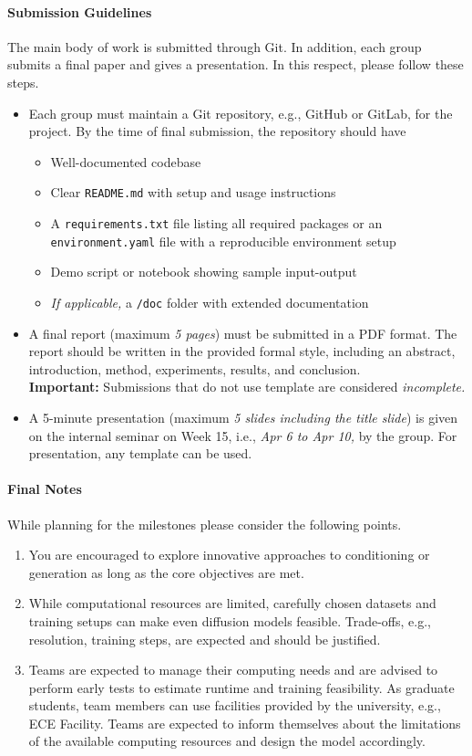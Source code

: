 \documentclass[11pt,a4paper,BCOR12mm, headexclude, footexclude, openright]{scrartcl}
\numberwithin{equation}{section}
\numberwithin{figure}{section}
\numberwithin{table}{section}
\begin{document}
\paragraph*{Submission Guidelines} The main body of work is submitted through Git. In addition, each group submits a final paper and gives a presentation. In this respect, please follow these steps.
\begin{itemize}
	\item Each group must maintain a Git repository, e.g., GitHub or GitLab, for the project. By the time of final submission, the repository should have
	\begin{itemize}
		\item Well-documented codebase
		\item Clear \texttt{README.md} with setup and usage instructions
		\item A \texttt{requirements.txt} file listing all required packages or an \texttt{environment.yaml} file with a reproducible environment setup
		\item Demo script or notebook showing sample input-output
		\item \textit{If applicable,} a \texttt{/doc} folder with extended documentation
	\end{itemize}
	\item A final report (maximum \textit{5 pages}) must be submitted in a PDF format. The report should be written in the provided formal style, including an abstract, introduction, method, experiments, results, and conclusion.\\
	\textbf{Important:} Submissions that do not use template are considered \textit{incomplete.}
	\item A 5-minute presentation (maximum \textit{5 slides including the title slide}) is given on the internal seminar on Week 15, i.e., \textit{Apr 6 to Apr 10,} by the group. For presentation, any template can be used.
\end{itemize}

	
	\paragraph*{Final Notes} While planning for the milestones please consider the following points.
	\begin{enumerate}
		\item You are encouraged to explore innovative approaches to conditioning or generation as long as the core objectives are met.
		\item While computational resources are limited, carefully chosen datasets and training setups can make even diffusion models feasible. Trade-offs, e.g., resolution, training steps, are expected and should be justified.
		\item Teams are expected to manage their computing needs and are advised to perform early tests to estimate runtime and training feasibility. As graduate students, team members can use facilities provided by the university, e.g., ECE Facility. Teams are expected to inform themselves about the limitations of the available computing resources and design the model accordingly.
	\end{enumerate}
	
	
	
	
\end{document}
